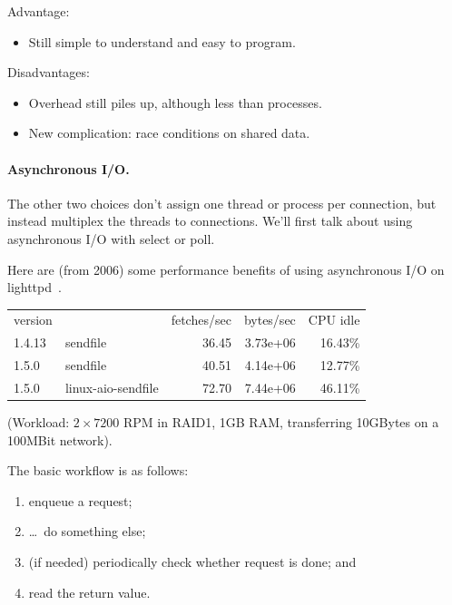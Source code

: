 \documentclass[a4paper]{report}
\begin{document}
    Advantage:
    \begin{itemize}
      \item Still simple to understand and easy to program.
    \end{itemize}

    Disadvantages:
    \begin{itemize}
      \item Overhead still piles up, although less than processes.
      \item New complication: race conditions on shared data.
    \end{itemize}

\paragraph{Asynchronous I/O.} The other two choices don't assign one thread or process per connection,
but instead multiplex the threads to connections. We'll first talk
about using asynchronous I/O with select or poll.  

Here are (from 2006) some performance benefits of using asynchronous
I/O on lighttpd~\cite{lttpd}.

    \begin{tabular}{llrrr}
    version & & fetches/sec & bytes/sec & CPU idle \\
    1.4.13 & sendfile & 36.45 & 3.73e+06 & 16.43\% \\
    1.5.0 & sendfile & 40.51 & 4.14e+06 & 12.77\% \\
    1.5.0 & linux-aio-sendfile & 72.70 & 7.44e+06 & 46.11\% \\
    \end{tabular}

(Workload: $2\times 7200$ RPM in RAID1, 1GB RAM, transferring 10GBytes on a 100MBit network).

The basic workflow is as follows: 
   \begin{enumerate}
     \item enqueue a request;
     \item \ldots ~do something else;
     \item (if needed) periodically check whether request is done; and
     \item read the return value.
   \end{enumerate}
\end{document}
